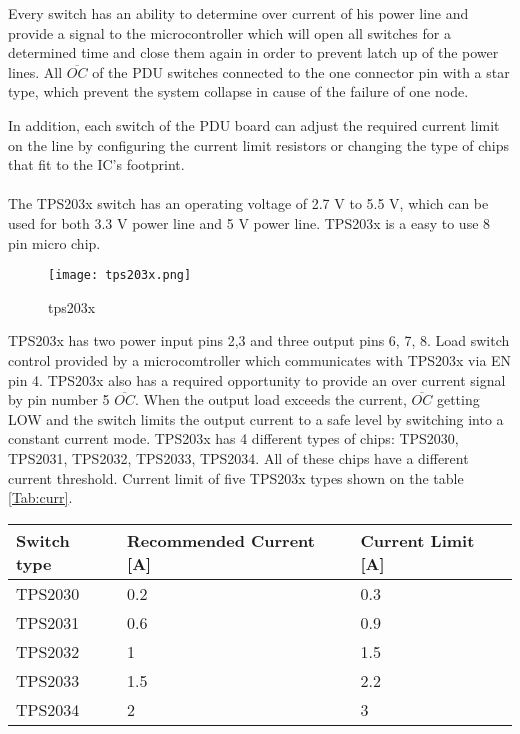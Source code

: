 Every switch has an ability to determine over current of his power line and provide a signal to the microcontroller which will open all switches for a determined time and close them again in order to prevent latch up of the power lines. All $\overline{OC}$ of the PDU switches connected to the one connector pin with a star type, which prevent the system collapse in cause of the failure of one node. 

In addition, each switch of the PDU board can adjust the required current limit on the line by configuring the current limit resistors or changing the type of chips that fit to the IC's footprint.    
  \\ \\

The TPS203x switch has an operating voltage of 2.7 V to 5.5 V, which can be used for both 3.3 V power line and 5 V power line. TPS203x is a easy to use 8 pin micro chip. 

\begin{figure}[h]
	\centering
	\texttt{[image: tps203x.png]}
	\caption{tps203x \cite{26}}
	\label{fig: PDU}
\end{figure} 

TPS203x has  two power input pins 2,3 and three output pins 6, 7, 8. Load switch control provided by a microcomtroller which communicates with TPS203x via EN pin 4. TPS203x also has a required opportunity to provide an over current signal by pin number 5 $\overline{OC}$. \cite{26} When the output load exceeds the current, $\overline{OC}$ getting LOW and the switch limits the output current to a safe level by switching into a constant current mode. TPS203x has 4 different types of chips: TPS2030, TPS2031, TPS2032, TPS2033, TPS2034. All of these chips have a different current threshold. Current limit of five TPS203x types shown on the table \ref{Tab:curr}.\\

\begin{tabular}{p{4cm}p{5cm}p{4cm}} \toprule
	Switch type & Recommended Current [A] & Current Limit [A]\\ \midrule
	TPS2030 & 0.2 & 0.3\\
	TPS2031 & 0.6 & 0.9\\
	TPS2032 & 1 & 1.5\\
	TPS2033 & 1.5 & 2.2 \\
	TPS2034 & 2 & 3 \\
	
	\bottomrule
	
\end{tabular}\\ \\ \\ \\
\label{Tab:curr}

